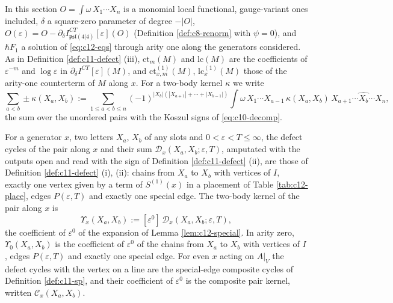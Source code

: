 In this section $O=\int\omega\,X_1\cdots X_n$ is a monomial local functional, gauge-variant ones included, $\delta$ a square-zero parameter of degree $-|O|$, $O(\varepsilon)=O-\partial_\delta I^{CT}_{\mathfrak{psl}(4|4)}[\varepsilon](O)$ (Definition \ref{def:c8-renorm} with $\psi=0$), and $\hbar F_1$ a solution of \eqref{eq:c12-eqs} through arity one along the generators considered. As in Definition \ref{def:c11-defect} (iii), $\mathrm{ct}_m(M)$ and $\mathrm{lc}(M)$ are the coefficients of $\varepsilon^{-m}$ and $\log\varepsilon$ in $\partial_\delta I^{CT}[\varepsilon](M)$, and $\mathrm{ct}^{(1)}_{x,m}(M)$, $\mathrm{lc}^{(1)}_x(M)$ those of the arity-one counterterm of $M$ along $x$. For a two-body kernel $\kappa$ we write
\begin{equation}
\sum_{a<b}\pm\kappa(X_a,X_b):=\sum_{1\le a<b\le n}(-1)^{|X_b|(|X_{a+1}|+\cdots+|X_{b-1}|)}\int\omega\,X_1\cdots X_{a-1}\,\kappa(X_a,X_b)\,X_{a+1}\cdots\widehat{X_b}\cdots X_n,
\label{eq:c12-pairsum}
\end{equation}
the sum over the unordered pairs with the Koszul signs of \eqref{eq:c10-decomp}.

\begin{definition}
\label{def:c12-kernel}
For a generator $x$, two letters $X_a$, $X_b$ of any slots and $0<\varepsilon<T\le\infty$, the defect cycles of the pair along $x$ and their sum $\mathcal D_x(X_a,X_b;\varepsilon,T)$, amputated with the outputs open and read with the sign of Definition \ref{def:c11-defect} (ii), are those of Definition \ref{def:c11-defect} (i), (ii): chains from $X_a$ to $X_b$ with vertices of $I$, exactly one vertex given by a term of $S^{(1)}(x)$ in a placement of Table \ref{tab:c12-place}, edges $P(\varepsilon,T)$ and exactly one special edge. The two-body kernel of the pair along $x$ is
\begin{equation}
\Upsilon_x(X_a,X_b):=[\varepsilon^0]\,\mathcal D_x(X_a,X_b;\varepsilon,T),
\label{eq:c12-kernel}
\end{equation}
the coefficient of $\varepsilon^0$ of the expansion of Lemma \ref{lem:c12-special}. In arity zero, $\Upsilon_0(X_a,X_b)$ is the coefficient of $\varepsilon^0$ of the chains from $X_a$ to $X_b$ with vertices of $I$, edges $P(\varepsilon,T)$ and exactly one special edge. For even $x$ acting on $A|_V$ the defect cycles with the vertex on a line are the special-edge composite cycles of Definition \ref{def:c11-sp}, and their coefficient of $\varepsilon^0$ is the composite pair kernel, written $\mathcal C_x(X_a,X_b)$.
\end{definition}


